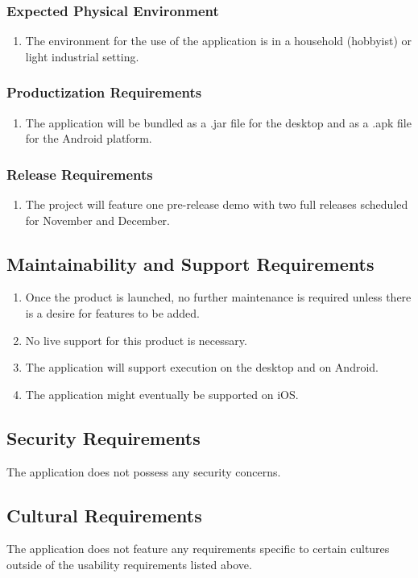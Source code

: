 \documentclass{article}
\begin{document}
\subsubsection{Expected Physical Environment}
\begin{enumerate}
\item The environment for the use of the application is in a household (hobbyist) or light industrial setting.
\end{enumerate}
\subsubsection{Productization Requirements}
\begin{enumerate}
\item The application will be bundled as a .jar file for the desktop and as a .apk file for the Android platform.
\end{enumerate}
\subsubsection{Release Requirements}
\begin{enumerate}
\item The project will feature one pre-release demo with two full releases scheduled for November and December.
\end{enumerate}
\subsection{Maintainability and Support Requirements}
\begin{enumerate}
\item Once the product is launched, no further maintenance is required unless there is a desire for features to be added.
\item No live support for this product is necessary.
\item The application will support execution on the desktop and on Android.
\item The application might eventually be supported on iOS.
\end{enumerate}
\subsection{Security Requirements}
The application does not possess any security concerns.
\subsection{Cultural Requirements}
The application does not feature any requirements specific to certain cultures outside of the usability requirements listed above.
\end{document}

